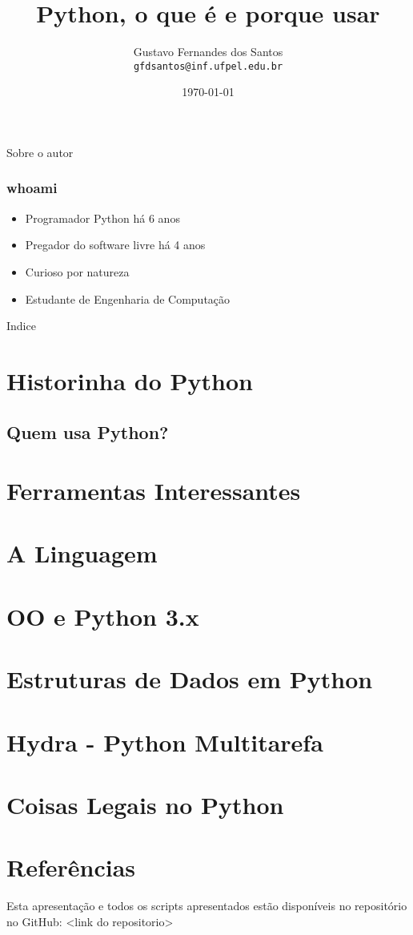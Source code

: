 \documentclass[aspectratio=169]{beamer}
\title[\sc{Texto no rodap\'e}]{Python, o que é e porque usar}
\author[Gustavo Santos]{Gustavo Fernandes dos Santos \\
\texttt{gfdsantos@inf.ufpel.edu.br}}
\institute{UFPEL - Universidade Federal de Pelotas}
\date{\today}
\begin{document}
\begin{frame}
  \titlepage
\end{frame}

\begin{frame}{Sobre o autor}
    \frametitle{whoami}
    \begin{itemize}
        \item Programador Python há 6 anos
        \item Pregador do software livre há 4 anos
        \item Curioso por natureza
        \item Estudante de Engenharia de Computação
    \end{itemize}
\end{frame}

\begin{frame}{Indice}
    \tableofcontents
\end{frame}

\section{Historinha do Python}

\subsection{Quem usa Python?}


\section{Ferramentas Interessantes}



\section{A Linguagem}



\section{OO e Python 3.x}

\section{Estruturas de Dados em Python}

\section{Hydra - Python Multitarefa}

\section{Coisas Legais no Python}

\section{Referências}

\begin{frame}
    Esta apresentação e todos os scripts apresentados estão disponíveis
no repositório no GitHub: <link do repositorio>
\end{frame}
\end{document}
